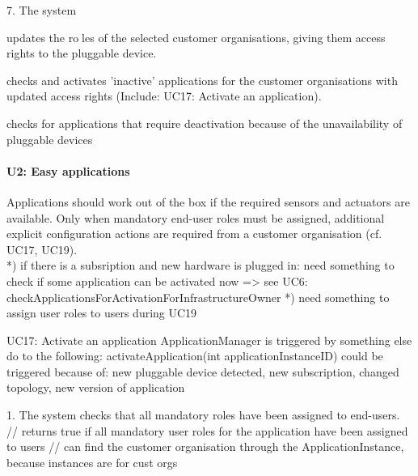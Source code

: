             7. The system
                { updates the roles of the selected customer organisations, giving them access rights to the pluggable device.
                { checks and activates 'inactive' applications for the customer organisations with updated access rights (Include: UC17: Activate an application).
                { checks for applications that require deactivation because of the unavailability of pluggable devices


    \paragraph{U2: Easy applications}
        Applications should work out of the box if the required sensors and
        actuators are available. Only when mandatory end-user roles must be
        assigned, additional explicit configuration actions are required
        from a customer organisation (cf. UC17, UC19). \\
        *) if there is a subsription and new hardware is plugged in: need something to check
           if some application can be activated now => see UC6: checkApplicationsForActivationForInfrastructureOwner
        *) need something to assign user roles to users during UC19

        UC17: Activate an application
            ApplicationManager is triggered by something else do to the following: activateApplication(int applicationInstanceID)
            could be triggered because of: new pluggable device detected, new subscription, changed topology, new version of application

            1. The system checks that all mandatory roles have been assigned to end-users.
                // returns true if all mandatory user roles for the application have been assigned to users
                // can find the customer organisation through the ApplicationInstance, because instances are for cust orgs

}}}
